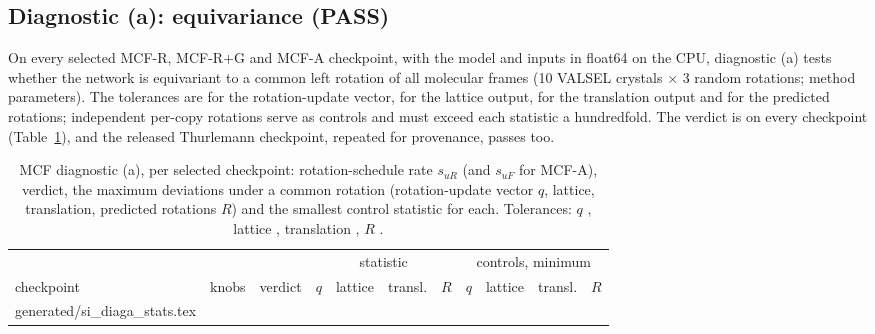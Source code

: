 \documentclass[journal=acsodf,manuscript=article]{achemso}
\makeatletter
\newcommand{\inputrows}[1]{\@@input #1 }
\makeatother
\begin{document}
\subsection{Diagnostic (a): equivariance (PASS)}
On every selected MCF-R, MCF-R+G and MCF-A checkpoint, with the model and inputs in float64 on
the CPU, diagnostic (a) tests whether the network is equivariant to a common left rotation of
all molecular frames (10 VALSEL crystals $\times$ 3 random rotations; method parameters). The
tolerances are \svTolQ{} for the rotation-update vector, \svTolLat{} for the lattice output,
\svTolTr{} for the translation output and \svTolR{} for the predicted rotations; independent
per-copy rotations serve as controls and must exceed each statistic a hundredfold. The verdict
is \svDiagAVerdict{} on every checkpoint (Table~\ref{tab:si_diaga}), and the released
Thurlemann checkpoint, repeated for provenance, passes too.

\begin{table}[htbp]
\caption{MCF diagnostic (a), per selected checkpoint: rotation-schedule rate $s_{uR}$ (and
$s_{uF}$ for MCF-A), verdict, the maximum deviations under a common rotation (rotation-update
vector $q$, lattice, translation, predicted rotations $R$) and the smallest control statistic
for each. Tolerances: $q$ \svTolQ, lattice \svTolLat, translation \svTolTr, $R$ \svTolR.}
\label{tab:si_diaga}
\centering
\scriptsize
\setlength{\tabcolsep}{2pt}
\begin{tabular}{@{}lllcccccccc@{}}
\toprule
 & & & \multicolumn{4}{c}{statistic} & \multicolumn{4}{c}{controls, minimum} \\
\cmidrule(lr){4-7}\cmidrule(lr){8-11}
checkpoint & knobs & verdict & $q$ & lattice & transl. & $R$ & $q$ & lattice & transl. & $R$ \\
\midrule
\inputrows{generated/si_diaga_stats.tex}
\bottomrule
\end{tabular}
\end{table}
\end{document}
